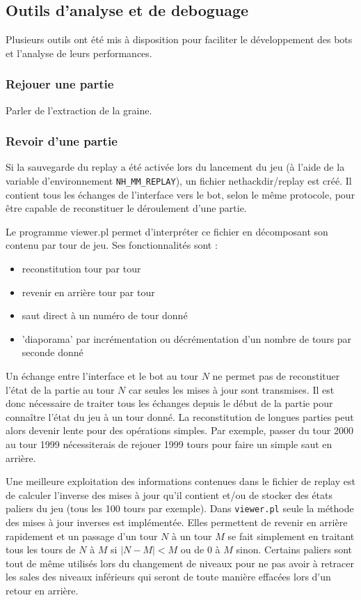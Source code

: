 \documentclass[a4paper,12pt]{article}
\begin{document}
\subsection{Outils d'analyse et de deboguage}

Plusieurs outils ont été mis à disposition pour faciliter le développement des bots et l'analyse de leurs performances.

\subsubsection{Rejouer une partie}

Parler de l'extraction de la graine.

\subsubsection{Revoir d'une partie}

	Si la sauvegarde du replay a été activée lors du lancement du jeu (à l'aide de la variable d'environnement \verb!NH_MM_REPLAY!), un fichier nethackdir/replay est créé. Il contient tous les échanges de l'interface vers le bot, selon le même protocole, pour être capable de reconstituer le déroulement d'une partie.

Le programme viewer.pl permet d'interpréter ce fichier en décomposant son contenu par tour de jeu. Ses fonctionnalités sont :
\begin{itemize}
	\item reconstitution tour par tour
	\item revenir en arrière tour par tour
	\item saut direct à un numéro de tour donné
	\item 'diaporama' par incrémentation ou décrémentation d'un nombre de tours par seconde donné
\end{itemize}

Un échange entre l'interface et le bot au tour $N$ ne permet pas de reconstituer l'état de la partie au tour $N$ car seules les mises à jour sont transmises. Il est donc nécessaire de traiter tous les échanges depuis le début de la partie pour connaître l'état du jeu à un tour donné. La reconstitution de longues parties peut alors devenir lente pour des opérations simples. Par exemple, passer du tour 2000 au tour 1999 nécessiterais de rejouer 1999 tours pour faire un simple saut en arrière.

Une meilleure exploitation des informations contenues dans le fichier de replay est de calculer l'inverse des mises à jour qu'il contient et/ou de stocker des états paliers du jeu (tous les 100 tours par exemple). Dans \verb!viewer.pl! seule la méthode des mises à jour inverses est implémentée. Elles permettent de revenir en arrière rapidement et un passage d'un tour $N$ à un tour $M$ se fait simplement en traitant tous les tours de $N$ à $M$ si $|N-M| < M$ ou de $0$ à $M$ sinon. Certains paliers sont tout de même utilisés lors du changement de niveaux pour ne pas avoir à retracer les sales des niveaux inférieurs qui seront de toute manière effacées lors d'un retour en arrière.
\end{document}

